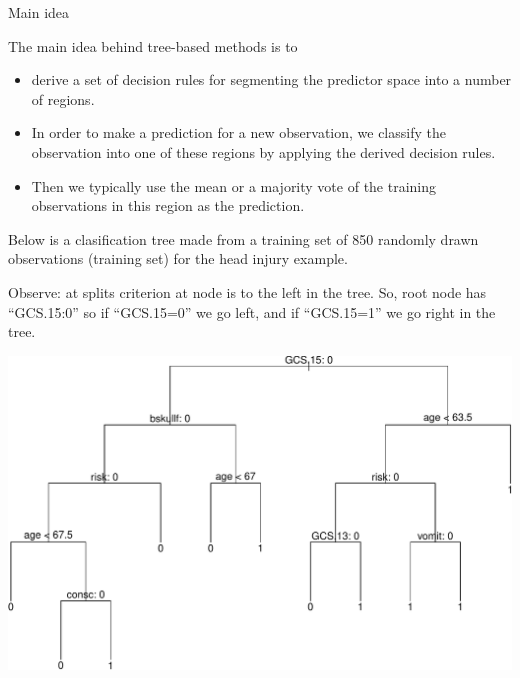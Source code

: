 \documentclass[ignorenonframetext,]{beamer}
\providecommand{\tightlist}{%
  \setlength{\itemsep}{0pt}\setlength{\parskip}{0pt}}
\begin{document}
\begin{frame}

\begin{block}{Main idea}

The main idea behind tree-based methods is to

\begin{itemize}
\tightlist
\item
  derive a set of decision rules for segmenting the predictor space into
  a number of regions.
\item
  In order to make a prediction for a new observation, we classify the
  observation into one of these regions by applying the derived decision
  rules.
\item
  Then we typically use the mean or a majority vote of the training
  observations in this region as the prediction.
\end{itemize}

Below is a clasification tree made from a training set of 850 randomly
drawn observations (training set) for the head injury example.

Observe: at splits criterion at node is to the left in the tree. So,
root node has ``GCS.15:0'' so if ``GCS.15=0'' we go left, and if
``GCS.15=1'' we go right in the tree.

\end{block}

\end{frame}

\begin{frame}

\includegraphics{8TreesBEAMER_files/figure-beamer/unnamed-chunk-2-1.pdf}

\end{frame}
\end{document}
